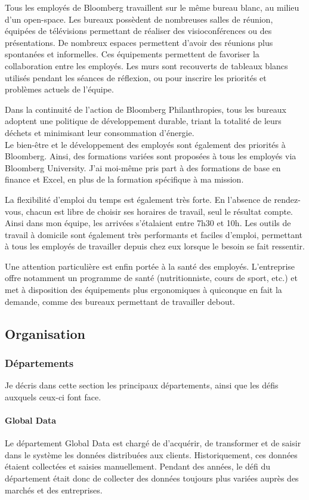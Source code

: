 \documentclass[11pt, oneside, titlepage, a4paper]{article}
\begin{document}
Tous les employés de Bloomberg travaillent sur le même bureau blanc, au milieu d'un open-space. Les bureaux possèdent de nombreuses salles de réunion, équipées de télévisions permettant de réaliser des visioconférences ou des présentations. De nombreux espaces permettent d'avoir des réunions plus spontanées et informelles. Ces équipements permettent de favoriser la collaboration entre les employés. Les murs sont recouverts de tableaux blancs utilisés pendant les séances de réflexion, ou pour inscrire les priorités et problèmes actuels de l'équipe.

Dans la continuité de l'action de Bloomberg Philanthropies, tous les bureaux adoptent une politique de développement durable, triant la totalité de leurs déchets et minimisant leur consommation d'énergie.
\\

Le bien-être et le développement des employés sont également des priorités à Bloomberg. Ainsi, des formations variées sont proposées à tous les employés via Bloomberg University. J'ai moi-même pris part à des formations de base en finance et Excel, en plus de la formation spécifique à ma mission.

La flexibilité d'emploi du temps est également très forte. En l'absence de rendez-vous, chacun est libre de choisir ses horaires de travail, seul le résultat compte. Ainsi dans mon équipe, les arrivées s'étalaient entre 7h30 et 10h. Les outils de travail à domicile sont également très performants et faciles d'emploi, permettant à tous les employés de travailler depuis chez eux lorsque le besoin se fait ressentir.

Une attention particulière est enfin portée à la santé des employés. L'entreprise offre notamment un programme de santé (nutritionniste, cours de sport, etc.) et met à disposition des équipements plus ergonomiques à quiconque en fait la demande, comme des bureaux permettant de travailler debout.
	\subsection{Organisation}
		\subsubsection{Départements}
Je décris dans cette section les principaux départements, ainsi que les défis auxquels ceux-ci font face.
\paragraph{Global Data}
Le département Global Data est chargé de d'acquérir, de transformer et de saisir dans le système les données distribuées aux clients. Historiquement, ces données étaient collectées et saisies manuellement. Pendant des années, le défi du département était donc de collecter des données toujours plus variées auprès des marchés et des entreprises.
\end{document}
